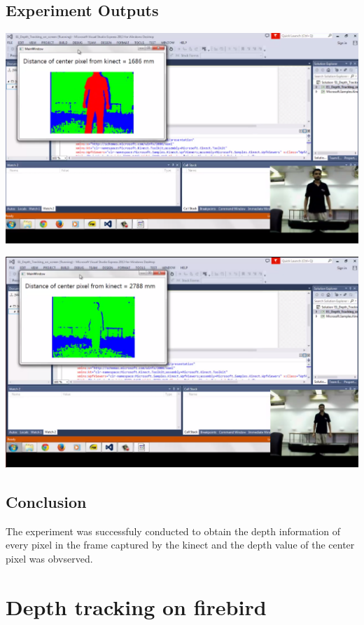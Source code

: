 \begin{flushleft}
\begin{enumerate}
\end{enumerate}
\medskip
\subsection{\textbf{ Experiment Outputs}}

\medskip

\includegraphics[scale = 0.5]{e11}

\medskip
\includegraphics[scale = 0.5]{e12}
\medskip

\subsection{\textbf{ Conclusion}}
The experiment was successfuly conducted to obtain the depth information of every pixel in the frame captured by the kinect and the depth value of the center pixel was obvserved.
\medskip

\newpage
\medskip

\section{\textbf{ Depth tracking on firebird}}
\label{4.2}


\end{flushleft}
